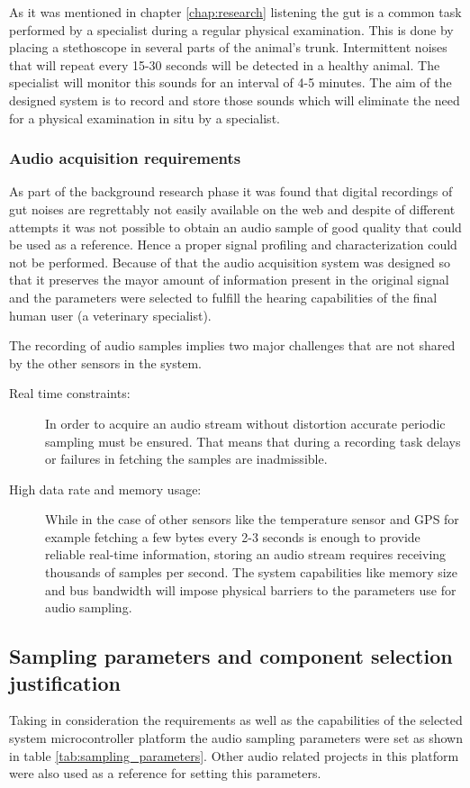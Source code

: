 As it was mentioned in chapter \ref{chap:research} listening the gut is a common task performed by a specialist during a regular physical examination. This is done by placing a stethoscope in several parts of the animal's trunk. Intermittent noises that will repeat every 15-30 seconds will be detected in a healthy animal. The specialist will monitor this sounds for an interval of 4-5 minutes. The aim of the designed system is to record and store those sounds which will eliminate the need for a physical examination in situ by a specialist.


\subsubsection{Audio acquisition requirements}
As part of the background research phase it was found that digital recordings of gut noises are regrettably not easily available on the web and despite of different attempts it was not possible to obtain an audio sample of good quality that could be used as a reference. Hence a proper signal profiling and characterization could not be performed. Because of that the audio acquisition system was designed so that it preserves the mayor amount of information present in the original signal and the parameters were selected to fulfill the hearing capabilities of the final human user (a veterinary specialist).

The recording of audio samples implies two major challenges that are not shared by the other sensors in the system.

\begin{description}
\item[Real time constraints:]
In order to acquire an audio stream without distortion accurate periodic sampling must be ensured. That means that during a recording task delays or failures in fetching the samples are inadmissible.

\item[High data rate and memory usage:]
While in the case of other sensors like the temperature sensor and GPS for example fetching a few bytes every 2-3 seconds is enough to provide reliable real-time information, storing an audio stream requires receiving thousands of samples per second. The system capabilities like memory size and bus bandwidth will impose physical barriers to the parameters use for audio sampling.
\end{description}


\subsection{Sampling parameters and component selection justification}
Taking in consideration the requirements as well as the capabilities of the selected system microcontroller platform the audio sampling parameters were set as shown in table \ref{tab:sampling_parameters}. Other audio related projects in this platform were also used as a reference for setting this parameters. 

